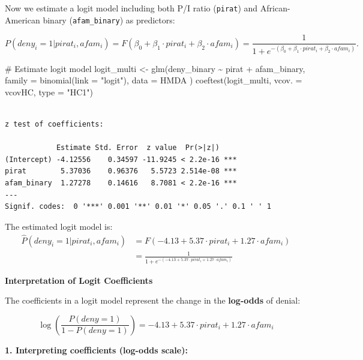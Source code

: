 \documentclass[
  12pt,
  letterpaper,
]{scrbook}
\newenvironment{Shaded}{\begin{snugshade}}{\end{snugshade}}
\newcommand{\AttributeTok}[1]{\textcolor[rgb]{0.40,0.45,0.13}{#1}}
\newcommand{\CommentTok}[1]{\textcolor[rgb]{0.37,0.37,0.37}{#1}}
\newcommand{\FunctionTok}[1]{\textcolor[rgb]{0.28,0.35,0.67}{#1}}
\newcommand{\NormalTok}[1]{\textcolor[rgb]{0.00,0.23,0.31}{#1}}
\newcommand{\OtherTok}[1]{\textcolor[rgb]{0.00,0.23,0.31}{#1}}
\newcommand{\SpecialCharTok}[1]{\textcolor[rgb]{0.37,0.37,0.37}{#1}}
\newcommand{\StringTok}[1]{\textcolor[rgb]{0.13,0.47,0.30}{#1}}
\theoremstyle{plain}
\theoremstyle{definition}
\theoremstyle{remark}
\begin{document}
Now we estimate a logit model including both P/I ratio (\texttt{pirat})
and African-American binary (\texttt{afam\_binary}) as predictors:

\[
P(deny_i = 1 | pirat_i, afam_i) = F(\beta_0 + \beta_1 \cdot pirat_i + \beta_2 \cdot afam_i) = \frac{1}{1 + e^{-(\beta_0 + \beta_1 \cdot pirat_i + \beta_2 \cdot afam_i)}} .
\]

\begin{Shaded}
\begin{Highlighting}[]
\CommentTok{\# Estimate logit model}
\NormalTok{logit\_multi }\OtherTok{\textless{}{-}} \FunctionTok{glm}\NormalTok{(deny\_binary }\SpecialCharTok{\textasciitilde{}}\NormalTok{ pirat }\SpecialCharTok{+}\NormalTok{ afam\_binary,}
    \AttributeTok{family =} \FunctionTok{binomial}\NormalTok{(}\AttributeTok{link =} \StringTok{"logit"}\NormalTok{),}
    \AttributeTok{data =}\NormalTok{ HMDA}
\NormalTok{)}
\FunctionTok{coeftest}\NormalTok{(logit\_multi, }\AttributeTok{vcov. =}\NormalTok{ vcovHC, }\AttributeTok{type =} \StringTok{"HC1"}\NormalTok{)}
\end{Highlighting}
\end{Shaded}

\begin{verbatim}

z test of coefficients:

            Estimate Std. Error  z value  Pr(>|z|)    
(Intercept) -4.12556    0.34597 -11.9245 < 2.2e-16 ***
pirat        5.37036    0.96376   5.5723 2.514e-08 ***
afam_binary  1.27278    0.14616   8.7081 < 2.2e-16 ***
---
Signif. codes:  0 '***' 0.001 '**' 0.01 '*' 0.05 '.' 0.1 ' ' 1
\end{verbatim}

The estimated logit model is: \[
\begin{split}
\widehat{P}(deny_i = 1 | pirat_i, afam_i) &= F(-4.13 + 5.37 \cdot pirat_i + 1.27 \cdot afam_i) \\
&= \frac{1}{1 + e^{-(-4.13 + 5.37 \cdot pirat_i + 1.27 \cdot afam_i)}}
\end{split}
\]

{\textbf{Interpretation of Logit Coefficients}}

The coefficients in a logit model represent the change in the
\textbf{log-odds} of denial:

\[
\log\left(\frac{P(deny = 1)}{1 - P(deny = 1)}\right) = -4.13 + 5.37 \cdot pirat_i + 1.27 \cdot afam_i
\]

\textbf{1. Interpreting coefficients (log-odds scale):}
\end{document}
